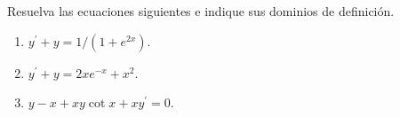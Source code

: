 Resuelva las ecuaciones siguientes e indique sus dominios de definición.

\begin{enumerate}[label=(\alph*),ref=\alph*,leftmargin=*]
\item $y^{\prime}+y=1/(1+e^{2x})$.
\item $y^{\prime}+y=2xe^{-x}+x^2$.
\item $y-x+xy\cot x+xy^{\prime}=0$.
\end{enumerate}
